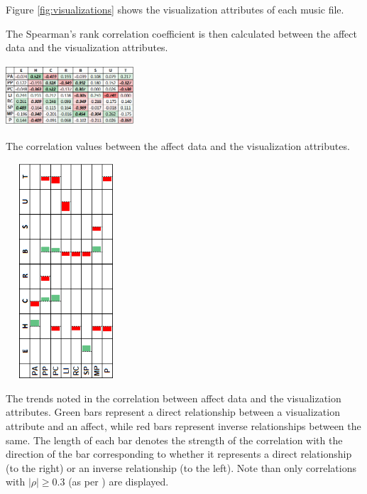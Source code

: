 \documentclass{sigchi-ext}
\begin{document}
Figure \ref{fig:visualizations} shows the visualization attributes of each music file.

The Spearman's rank correlation coefficient is then calculated between the affect data and the visualization attributes. 

\begin{marginfigure}[-5pc]
\begin{minipage}{\marginparwidth}
     \includegraphics[width=4.75cm,height=2.3cm]{figures/AffectVisualization.png}
    \caption{The correlation values between the affect data and the visualization attributes.}
    \label{fig:correlation}
    \end{minipage}
\end{marginfigure}

\begin{marginfigure}[0pc]
\begin{minipage}{\marginparwidth}
     \includegraphics[width=4.5cm,height=8cm]{figures/TrendsNew_Rotated.png}
    \caption{The trends noted in the correlation between affect data and the visualization attributes. Green bars represent a direct relationship between a visualization attribute and an affect, while red bars represent inverse relationships between the same. The length of each bar denotes the strength of the correlation with the direction of the bar corresponding to whether it represents a direct relationship (to the right) or an inverse relationship (to the left). Note than only correlations with $|\rho| \geq 0.3$ (as per \cite{Cohen:1988}) are displayed.}
    \label{fig:trends}
    \end{minipage}
\end{marginfigure}
\end{document}
